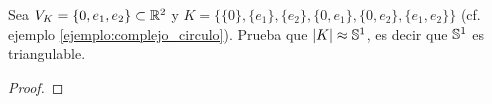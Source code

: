 \begin{ejercicio}\label{ej:50}
  Sea $V_K=\{0,e_1,e_2\}\subset\mathbb{R}^2$ y $K=\{\{0\},\{e_1\},\{e_2\},\{0,e_1\},\{0,e_2\},\{e_1,e_2\}\}$
  (cf. ejemplo \ref{ejemplo:complejo_circulo}). Prueba que $\left| K \right|\approx\mathbb{S}^1$, es decir que
  $\mathbb{S}^1$ es triangulable.
\end{ejercicio}
\begin{proof}%

\end{proof}%

